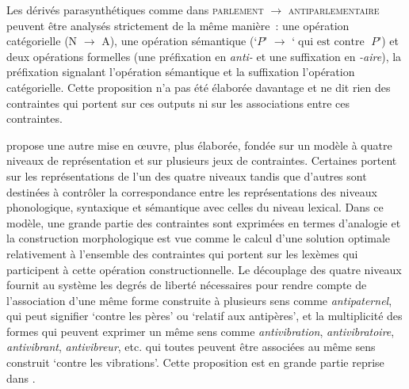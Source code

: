 \documentclass[output=paper]{langsci/langscibook}
\begin{document}
Les dérivés parasynthétiques comme dans \textsc{parlement} $\rightarrow$ \textsc{antiparlementaire} peuvent être analysés strictement de la même manière~: une opération catégorielle (N $\rightarrow$ A), une opération sémantique (`$P$' $\rightarrow$ `$\operatorname{qui~est~contre~} P$') et deux opérations formelles (une préfixation en \emph{\mbox{anti-}} et une suffixation en \emph{\mbox{-aire}}), la préfixation signalant l'opération sémantique et la suffixation l'opération catégorielle.  Cette proposition n'a pas été élaborée davantage et \cite{roche2009.bslp} ne dit rien des contraintes qui portent sur ces outputs ni sur les associations entre ces contraintes.

\cite{hathout2011.dumal} propose une autre mise en œuvre, plus élaborée, fondée sur un modèle à quatre niveaux de représentation et sur plusieurs jeux de contraintes.  Certaines  portent sur les représentations de l'un des quatre niveaux tandis que d'autres sont destinées à contrôler la correspondance entre les représentations des niveaux phonologique, syntaxique et sémantique avec celles du niveau lexical.  Dans ce modèle, une grande partie des contraintes sont exprimées en termes d'analogie et la construction morphologique est vue comme le calcul d'une solution optimale relativement à l'ensemble des contraintes qui portent sur les lexèmes qui participent à cette opération constructionnelle.
Le découplage des quatre niveaux fournit au système les degrés de liberté nécessaires pour rendre compte de l'association d'une même forme construite à plusieurs sens comme \emph{antipaternel}, qui peut signifier `contre les pères' ou `relatif aux antipères', et la multiplicité des formes qui peuvent exprimer un même sens comme \emph{antivibration}, \emph{antivibratoire}, \emph{antivibrant}, \emph{antivibreur}, etc. qui toutes peuvent être associées au même sens construit `contre les vibrations'.  Cette proposition est en grande partie reprise dans \paradis{}.
\end{document}
